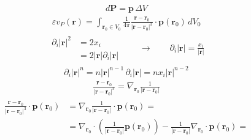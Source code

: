 \documentclass[letterpaper,10pt,italian]{jupyterBook}
\begin{document}
\sphinxAtStartPar
{}
\begin{equation*}
\begin{split}d \mathbf{P} = \mathbf{p} \, \Delta V\end{split}
\end{equation*}\begin{equation*}
\begin{split}\varepsilon v_P(\mathbf{r}) = \int_{\mathbf{r}_0 \in V_0} \frac{1}{4 \pi}
 \frac{\mathbf{r} - \mathbf{r}_0}{\left|\mathbf{r} - \mathbf{r}_0 \right|^3} \cdot \mathbf{p}(\mathbf{r}_0) \, dV_0 \end{split}
\end{equation*}\begin{equation*}
\begin{split}\begin{aligned}
\partial_i |\mathbf{r}|^2 & = 2 x_i \\
                          & = 2 |\mathbf{r}| \partial_i |\mathbf{r}|
\end{aligned}
\qquad \rightarrow \qquad \partial_i |\mathbf{r}| = \frac{x_i}{|\mathbf{r}|}\end{split}
\end{equation*}\begin{equation*}
\begin{split}\partial_i |\mathbf{r}|^n = n |\mathbf{r}|^{n-1} \, \partial_i |\mathbf{r}| = n x_i |\mathbf{r}|^{n-2}\end{split}
\end{equation*}\begin{equation*}
\begin{split}\frac{\mathbf{r}-\mathbf{r}_0}{|\mathbf{r}-\mathbf{r}_0|^3} = \nabla_{\mathbf{r}_0} \frac{1}{|\mathbf{r}-\mathbf{r}_0|}\end{split}
\end{equation*}\begin{equation*}
\begin{split}\begin{aligned}
\frac{\mathbf{r}- \mathbf{r}_0}{|\mathbf{r}- \mathbf{r}_0|^3} \cdot \mathbf{p}(\mathbf{r}_0) 
 & = \nabla_{\mathbf{r}_0} \frac{1}{|\mathbf{r}-\mathbf{r}_0|} \cdot \mathbf{p}(\mathbf{r}_0) = \\
 & = \nabla_{\mathbf{r}_0} \cdot \left( \frac{1}{|\mathbf{r}-\mathbf{r}_0|} \mathbf{p}(\mathbf{r}_0) \right) - \frac{1}{|\mathbf{r}- \mathbf{r}_0|} \nabla_{\mathbf{r}_0} \cdot \mathbf{p}(\mathbf{r}_0) = \\
\end{aligned}\end{split}
\end{equation*}
\end{document}
